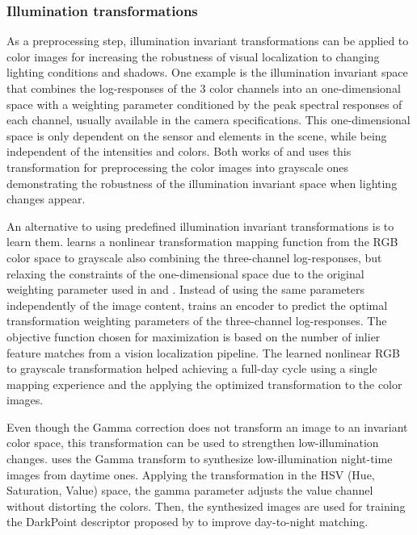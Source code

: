 \subsubsection{Illumination transformations}

As a preprocessing step, illumination invariant transformations can be applied to color images for increasing the robustness of visual localization to changing lighting conditions and shadows.
One example is the illumination invariant space that combines the log-responses of the 3 color channels into an one-dimensional space with a weighting parameter conditioned by the peak spectral responses of each channel, usually available in the camera specifications. This one-dimensional space is only dependent on the sensor and elements in the scene, while being independent of the intensities and colors.
Both works of \cite{arroyo-et-al:2018:7} and \cite{yang-et-al:2021:12054} uses this transformation for preprocessing the color images into grayscale ones demonstrating the robustness of the illumination invariant space when lighting changes appear.

An alternative to using predefined illumination invariant transformations is to learn them.
\cite{clement-et-al:2020:2967659} learns a nonlinear transformation mapping function from the RGB color space to grayscale also combining the three-channel log-responses, but relaxing the constraints of the one-dimensional space due to the original weighting parameter used in \cite{arroyo-et-al:2018:7} and \cite{yang-et-al:2021:12054}. Instead of using the same parameters independently of the image content, \cite{clement-et-al:2020:2967659} trains an encoder to predict the optimal transformation weighting parameters of the three-channel log-responses.
The objective function chosen for maximization is based on the number of inlier feature matches from a vision localization pipeline.
The learned nonlinear RGB to grayscale transformation helped achieving a full-day cycle using a single mapping experience and the applying the optimized transformation to the color images.

Even though the Gamma correction does not transform an image to an invariant color space, this transformation can be used to strengthen low-illumination changes. \cite{sun-et-al:2021:9635886} uses the Gamma transform to synthesize low-illumination night-time images from daytime ones. Applying the transformation in the HSV (Hue, Saturation, Value) space, the gamma parameter adjusts the value channel without distorting the colors. Then, the synthesized images are used for training the DarkPoint descriptor proposed by \cite{sun-et-al:2021:9635886} to improve day-to-night matching.




